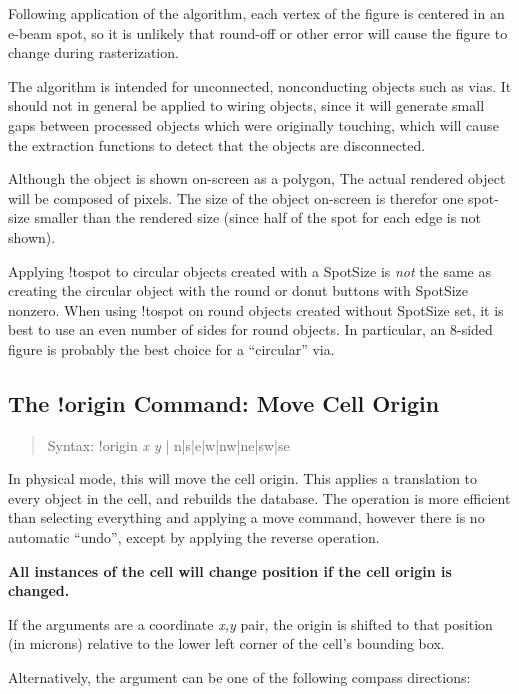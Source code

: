 Following application of the algorithm, each vertex of the figure is
centered in an e-beam spot, so it is unlikely that round-off or other
error will cause the figure to change during rasterization.

The algorithm is intended for unconnected, nonconducting objects such
as vias.  It should not in general be applied to wiring objects, since
it will generate small gaps between processed objects which were
originally touching, which will cause the extraction functions to
detect that the objects are disconnected.

Although the object is shown on-screen as a polygon, The actual
rendered object will be composed of pixels.  The size of the object
on-screen is therefor one spot-size smaller than the rendered size
(since half of the spot for each edge is not shown).

Applying {\cb !tospot} to circular objects created with a {\et
SpotSize} is {\it not} the same as creating the circular object with
the {\cb round} or {\cb donut} buttons with {\et SpotSize} nonzero. 
When using {\cb !tospot} on round objects created without {\et
SpotSize} set, it is best to use an even number of sides for round
objects.  In particular, an 8-sided figure is probably the best choice
for a ``circular'' via.

\subsection{The {\cb !origin} Command: Move Cell Origin}
\begin{quote}
Syntax: {\vt !origin} {\it x y\/} {\vt | n|s|e|w|nw|ne|sw|se}
\end{quote}
In physical mode, this will move the cell origin.  This applies a
translation to every object in the cell, and rebuilds the database. 
The operation is more efficient than selecting everything and applying
a move command, however there is no automatic ``undo'', except by
applying the reverse operation.
    
{\bf All instances of the cell will change position if the cell origin
is changed.}
    
If the arguments are a coordinate {\it x,y} pair, the origin is
shifted to that position (in microns) relative to the lower left
corner of the cell's bounding box.

Alternatively, the argument can be one of the following compass
directions:
      
